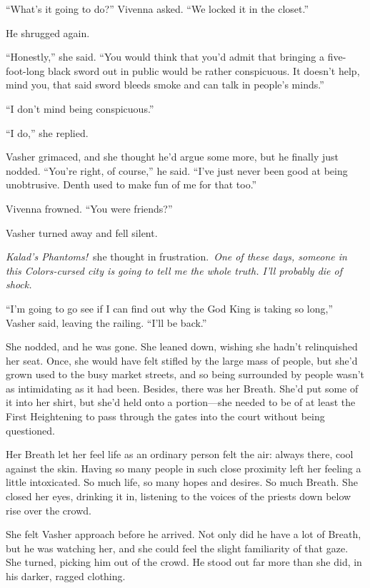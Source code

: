 “What’s it going to do?” Vivenna asked. “We locked it in the closet.”

He shrugged again.

“Honestly,” she said. “You would think that you’d admit that bringing a five-foot-long black sword out in public would be rather conspicuous. It doesn’t help, mind you, that said sword bleeds smoke and can talk in people’s minds.”

“I don’t mind being conspicuous.”

“I do,” she replied.

Vasher grimaced, and she thought he’d argue some more, but he finally just nodded. “You’re right, of course,” he said. “I’ve just never been good at being unobtrusive. Denth used to make fun of me for that too.”

Vivenna frowned. “You were friends?”

Vasher turned away and fell silent.

\textit{Kalad’s Phantoms!}~she thought in frustration.~\textit{One of these days, someone in this Colors-cursed city is going to tell me the whole truth. I’ll probably die of shock.}

“I’m going to go see if I can find out why the God King is taking so long,” Vasher said, leaving the railing. “I’ll be back.”

She nodded, and he was gone. She leaned down, wishing she hadn’t relinquished her seat. Once, she would have felt stifled by the large mass of people, but she’d grown used to the busy market streets, and so being surrounded by people wasn’t as intimidating as it had been. Besides, there was her Breath. She’d put some of it into her shirt, but she’d held onto a portion—she needed to be of at least the First Heightening to pass through the gates into the court without being questioned.

Her Breath let her feel life as an ordinary person felt the air: always there, cool against the skin. Having so many people in such close proximity left her feeling a little intoxicated. So much life, so many hopes and desires. So much Breath. She closed her eyes, drinking it in, listening to the voices of the priests down below rise over the crowd.

She felt Vasher approach before he arrived. Not only did he have a lot of Breath, but he was watching her, and she could feel the slight familiarity of that gaze. She turned, picking him out of the crowd. He stood out far more than she did, in his darker, ragged clothing.

